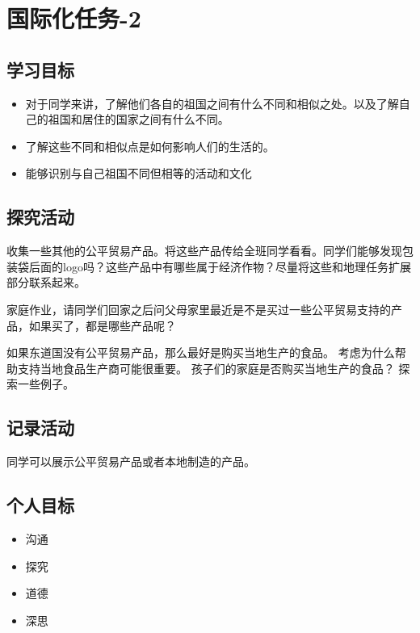 \chapter{国际化任务-2}


\section{学习目标}

\begin{itemize}
  \item 对于同学来讲，了解他们各自的祖国之间有什么不同和相似之处。以及了解自己的祖国和居住的国家之间有什么不同。
  \item 了解这些不同和相似点是如何影响人们的生活的。
  \item 能够识别与自己祖国不同但相等的活动和文化 
\end{itemize}

\section{探究活动}   
   收集一些其他的公平贸易产品。将这些产品传给全班同学看看。同学们能够发现包装袋后面的logo吗？这些产品中有哪些属于经济作物？尽量将这些和地理任务扩展部分联系起来。\par
   家庭作业，请同学们回家之后问父母家里最近是不是买过一些公平贸易支持的产品，如果买了，都是哪些产品呢？\par
   如果东道国没有公平贸易产品，那么最好是购买当地生产的食品。 考虑为什么帮助支持当地食品生产商可能很重要。 孩子们的家庭是否购买当地生产的食品？ 探索一些例子。\par




\section{记录活动}
   同学可以展示公平贸易产品或者本地制造的产品。

\section{个人目标}

\begin{itemize}
  \item 沟通
  \item 探究
  \item 道德
  \item 深思
\end{itemize}

